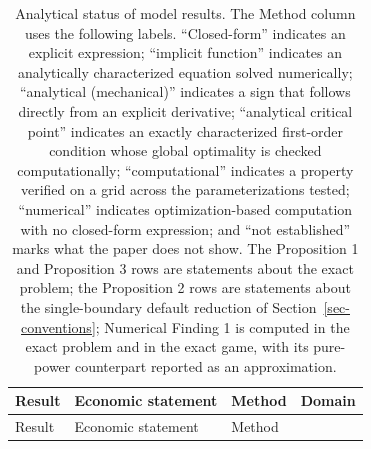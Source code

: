 \documentclass[
  11pt,
  letterpaper,
]{scrartcl}
\begin{document}
\begin{longtable}[]{@{}
  >{\raggedright\arraybackslash}p{}
  >{\raggedright\arraybackslash}p{}
  >{\raggedright\arraybackslash}p{}
  >{\raggedright\arraybackslash}p{}@{}}
\caption{Analytical status of model results. The Method column uses the
following labels. ``Closed-form'' indicates an explicit expression;
``implicit function'' indicates an analytically characterized equation
solved numerically; ``analytical (mechanical)'' indicates a sign that
follows directly from an explicit derivative; ``analytical critical
point'' indicates an exactly characterized first-order condition whose
global optimality is checked computationally; ``computational''
indicates a property verified on a grid across the parameterizations
tested; ``numerical'' indicates optimization-based computation with no
closed-form expression; and ``not established'' marks what the paper
does not show. The Proposition 1 and Proposition 3 rows are statements
about the exact problem; the Proposition 2 rows are statements about the
single-boundary default reduction of Section~\ref{sec-conventions};
Numerical Finding 1 is computed in the exact problem and in the exact
game, with its pure-power counterpart reported as an
approximation.}\label{tbl-result-taxonomy}\tabularnewline
\toprule\noalign{}
\begin{minipage}[b]{\linewidth}\raggedright
Result
\end{minipage} & \begin{minipage}[b]{\linewidth}\raggedright
Economic statement
\end{minipage} & \begin{minipage}[b]{\linewidth}\raggedright
Method
\end{minipage} & \begin{minipage}[b]{\linewidth}\raggedright
Domain
\end{minipage} \\
\midrule\noalign{}
\endfirsthead
\toprule\noalign{}
\begin{minipage}[b]{\linewidth}\raggedright
Result
\end{minipage} & \begin{minipage}[b]{\linewidth}\raggedright
Economic statement
\end{minipage} & \begin{minipage}[b]{\linewidth}\raggedright
Method
\end{minipage} & \begin{minipage}[b]{\linewidth}\raggedright

\end{minipage}
\end{longtable}
\end{document}
